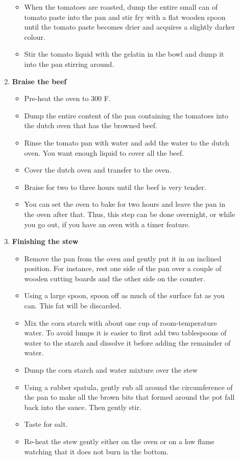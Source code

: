 \documentclass[11pt,letterpaper]{article}
\newcommand \fileName {RustRoast}
\begin{document}
\begin{description}
\begin{enumerate}
\begin{itemize}
		\item When the tomatoes are roasted, dump the entire small can of tomato paste into the pan and stir fry with a flat wooden spoon until the tomato paste becomes drier and acquires a slightly darker colour.
		\item Stir the  tomato liquid with the gelatin  in the bowl and dump it into the pan stirring around.
	\end{itemize}
	\item {\bf Braise the beef}
	\begin{itemize}
	\item Pre-heat the oven to 300 F.
	\item Dump the entire content of the pan containing the tomatoes into the dutch oven that has the browned beef.
	\item Rinse the tomato pan with water and add the water to the dutch oven. You want enough liquid to cover all the beef.
	\item Cover the dutch oven and transfer to the oven.
	\item Braise for two to three hours until the beef is very tender.
	\item You can set the oven to bake for two hours and leave the pan in the oven after that. Thus, this step can be done overnight, or while you go out, if you have an oven with a timer feature.
	\end{itemize}
	\item {\bf Finishing the stew}
	\begin{itemize}
	\item Remove the pan from the oven and gently put it in an inclined position. For instance, rest one side of the pan over a couple of wooden cutting boards and the other side on the counter. 
	\item Using a large spoon, spoon off as much of the surface fat as you can. This fat will be discarded.
	\item Mix the corn starch with about one cup of room-temperature water. To avoid lumps it is easier to first add two tablespoons of water to the starch and dissolve it before adding the remainder of water.
	\item Dump the corn starch and water mixture over the stew 
	\item Using a rubber spatula, gently rub all around the circumference of the pan to make all the brown bits that formed around the pot fall back into the sauce. Then gently stir.
	\item Taste for salt.
	\item Re-heat the stew gently either on the oven or on a low flame watching that it does not burn in the bottom.
	\end{itemize}
     	\end{enumerate}         
\end{description}

\end{document}
